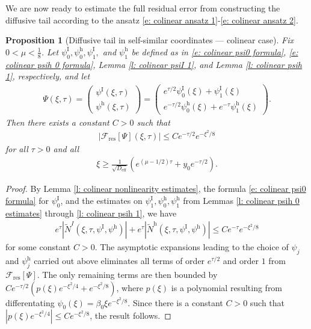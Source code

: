 \documentclass[11pt]{article}
\newcommand{\mcf}{\mathcal{F}}
\newtheorem{prop}{Proposition}
\numberwithin{equation}{section}
\numberwithin{prop}{section}
\newcommand{\psih}{\psi^\mathrm{h}}
\newcommand{\Deff}{D_\mathrm{eff}}
\newcommand{\psiI}{\psi^\mathrm{I}}
\begin{document}
We are now ready to estimate the full residual error from constructing the diffusive tail according to the ansatz \eqref{e: colinear ansatz 1}-\eqref{e: colinear ansatz 2}. 
\begin{prop}[Diffusive tail in self-similar coordinates --- colinear case]
	Fix $0 < \mu < \frac{1}{8}$. Let $\psiI_0, \psih_0, \psiI_1,$ and $\psih_1$ be defined as in \eqref{e: colinear psi0 formula}, \eqref{e: colinear psih 0 formula}, Lemma \ref{l: colinear psiI 1}, and Lemma \ref{l: colinear psih 1}, respectively, and let 
	\begin{align}
	\Psi(\xi, \tau) = \begin{pmatrix}
	\psiI (\xi, \tau) \\ \psih(\xi, \tau)
	\end{pmatrix} = \begin{pmatrix}
	e^{\tau/2} \psiI_0 (\xi) + \psiI_1 (\xi) \\
	e^{-\tau/2} \psih_0(\xi) + e^{-\tau} \psih_1(\xi)
	\end{pmatrix}. 
	\end{align}
	Then there exists a constant $C > 0$ such that 
	\begin{align}
	| \mcf_\mathrm{res}[\Psi] (\xi, \tau)| \leq C e^{-\tau/2} e^{-\xi^2/8} \label{e: colinear Psi residual estimate}
	\end{align}
	for all $\tau > 0$ and all
	\begin{align}
	\xi \geq \frac{1}{\sqrt{\Deff}} \left( e^{(\mu-1/2) \tau} + y_0 e^{-\tau/2} \right). \label{e: tail xi restriction}
	\end{align}
\end{prop}
\begin{proof}
	By Lemma \ref{l: colinear nonlinearity estimates}, the formula \eqref{e: colinear psi0 formula} for $\psiI_0$, and the estimates on $\psiI_1, \psih_0, \psih_1$ from Lemmas \ref{l: colinear psih 0 estimates} through \ref{l: colinear psih 1}, we have 
	\begin{align*}
		e^\tau |\tilde{N}^I (\xi, \tau, \psiI, \psih)| + e^\tau |\tilde{N}^\mathrm{h} (\xi, \tau, \psiI, \psih)| \leq C e^{-\tau} e^{-\xi^2/8}
	\end{align*} 
	for some constant $C > 0$. The asymptotic expansions leading to the choice of $\psi_j$ and $\psih_j$ carried out above eliminates all terms of order $e^{\tau/2}$ and order $1$ from $\mcf_\mathrm{res}[\Psi]$. The only remaining terms are then bounded by $C e^{-\tau/2}( p(\xi) e^{-\xi^2/4} + e^{-\xi^2/8})$, where $p(\xi)$ is a polynomial resulting from differentating $\psi_0 (\xi) = \beta_0 \xi e^{-\xi^2/8}$. Since there is a constant $C > 0$ such that $|p(\xi) e^{-\xi^2 /4}|\leq C e^{-\xi^2/8}$, the result follows. 
\end{proof}
\end{document}
